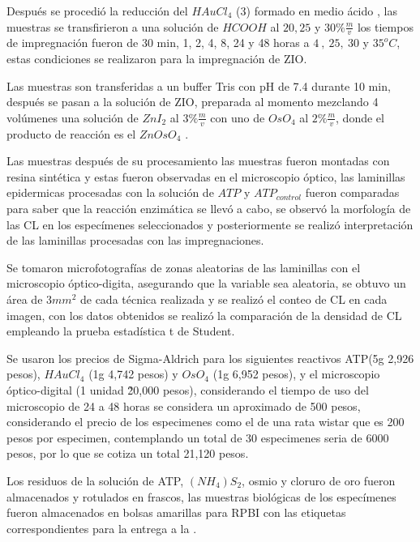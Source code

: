 Después se procedió la reducción del $HAuCl_{4}$ (3) formado en medio ácido \cite{article:reduccionOro}, las muestras se transfirieron a una solución de $HCOOH$ al $20,25$ y $30\%\frac{m}{v}$ los tiempos de impregnación fueron de 30 min, 1, 2, 4, 8, 24 y 48 horas a $4~,~25,~30$ y $35^oC$, estas condiciones se realizaron para la impregnación de ZIO.




Las muestras son transferidas a un buffer Tris con pH de 7.4 durante 10 min, después se pasan a la solución de ZIO, preparada al momento mezclando 4 volúmenes una solución de $ZnI_{2}$ al $3\%\frac{m}{v}$ con uno de $OsO_{4}$ al $2\%\frac{m}{v}$, donde el producto de reacción es el $ZnOsO_{4}$ \cite{article:productoZIO}.


Las muestras después de su procesamiento las muestras fueron montadas con resina sintética y estas fueron observadas en el microscopio óptico, las laminillas epidermicas procesadas con la solución de $ATP$ y $ATP_{control}$ fueron comparadas para saber que la reacción enzimática se llevó a cabo, se observó la morfología de las CL en los especímenes seleccionados y posteriormente se realizó interpretación de las laminillas procesadas con las impregnaciones.


Se tomaron microfotografías de zonas aleatorias de las laminillas con el microscopio óptico-digita, asegurando que la variable sea aleatoria, se obtuvo un área de $3mm^{2}$ de cada técnica realizada y se realizó el conteo de CL en cada imagen, con los datos obtenidos se realizó la comparación de la densidad de CL empleando la prueba estadística t de Student.


Se usaron los precios de Sigma-Aldrich para los siguientes reactivos ATP(5g 2,926 pesos), $HAuCl_{4}$ (1g 4,742 pesos) y $OsO_{4}$ (1g 6,952 pesos), y el microscopio óptico-digital (1 unidad \~20,000 pesos), considerando el tiempo de uso del microscopio de 24 a 48 horas se considera un aproximado de 500 pesos, considerando el precio de los especimenes como el de una rata wistar que es 200 pesos por especimen, contemplando un total de 30 especimenes seria de 6000 pesos, por lo que se cotiza un total 21,120 pesos.


Los residuos de la solución de ATP, $(NH_{4})S_{2}$, osmio y cloruro de oro fueron almacenados y rotulados en frascos, las muestras biológicas de los especímenes fueron almacenados en bolsas amarillas para RPBI con las etiquetas correspondientes para la entrega a la .


